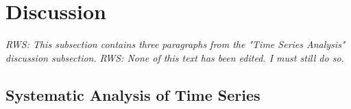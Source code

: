 \documentclass{ametsoc}
\begin{document}




\section{Discussion}

\emph{RWS: This subsection contains three paragraphs from the "Time Series Analysis" discussion subsection.}
\emph{RWS: None of this text has been edited. I must still do so.}
\subsection{Systematic Analysis of Time Series}

\end{document}
